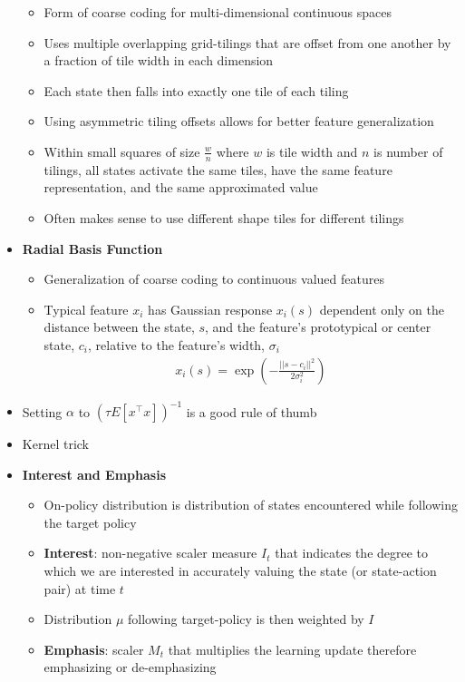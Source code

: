 \documentclass[12pt]{article}
\begin{document}
\begin{itemize}
\begin{itemize}
      \item Form of coarse coding for multi-dimensional continuous spaces
      \item Uses multiple overlapping grid-tilings that are offset from one another by a fraction of tile width in each dimension
      \item Each state then falls into exactly one tile of each tiling
      \item Using asymmetric tiling offsets allows for better feature generalization
      \item Within small squares of size $\frac{w}{n}$ where $w$ is tile width and $n$ is number of tilings,
      all states activate the same tiles, have the same feature representation, and the same approximated value
      \item Often makes sense to use different shape tiles for different tilings
    \end{itemize}
    \item \textbf{Radial Basis Function}
    \begin{itemize}
      \item Generalization of coarse coding to continuous valued features
      \item Typical feature $x_i$ has Gaussian response $x_i(s)$ dependent only on the distance
      between the state, $s$, and the feature's prototypical or center state, $c_i$, relative to the
      feature's width, $\sigma_i$
      \begin{gather*}
        x_i(s) = \exp(-\frac{||s - c_i||^2}{2\sigma_i^2})
      \end{gather*}
    \end{itemize}
    \item Setting $\alpha$ to $(\tau E[x^\top x])^{-1}$ is a good rule of thumb
    \item Kernel trick
    \item \textbf{Interest and Emphasis}
    \begin{itemize}
      \item On-policy distribution is distribution of states encountered while following
      the target policy
      \item \textbf{Interest}: non-negative scaler measure $I_t$ that indicates the degree to which we
      are interested in accurately valuing the state (or state-action pair) at time $t$
      \item Distribution $\mu$ following target-policy is then weighted by $I$
      \item \textbf{Emphasis}: scaler $M_t$ that multiplies the learning update therefore emphasizing or de-emphasizing

\end{itemize}
\end{itemize}
\end{document}
